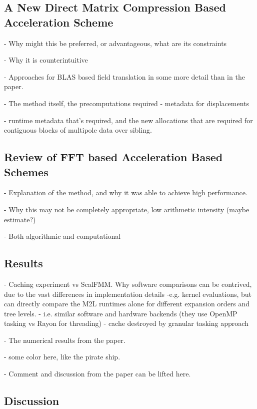 \subsection{A New Direct Matrix Compression Based Acceleration Scheme}

- Why might this be preferred, or advantageous, what are its constraints

- Why it is counterintuitive

- Approaches for BLAS based field translation in some more detail than in the paper.

- The method itself, the precomputations required - metadata for displacements

- runtime metadata that's required, and the new allocations that are required for contiguous blocks of multipole data over sibling.



\subsection{Review of FFT based Acceleration Based Schemes}

- Explanation of the method, and why it was able to achieve high performance.

- Why this may not be completely appropriate, low arithmetic intensity (maybe estimate?)

- Both algorithmic and computational

\subsection{Results}

- Caching experiment vs ScalFMM. Why software comparisons can be contrived, due to the vast differences in implementation details -e.g. kernel evaluations, but can directly compare the M2L runtimes alone for different expansion orders and tree levels.
    - i.e. similar software and hardware backends (they use OpenMP tasking vs Rayon for threading)
    - cache destroyed by granular tasking approach

- The numerical results from the paper.

- some color here, like the pirate ship.

- Comment and discussion from the paper can be lifted here.


\subsection{Discussion}

